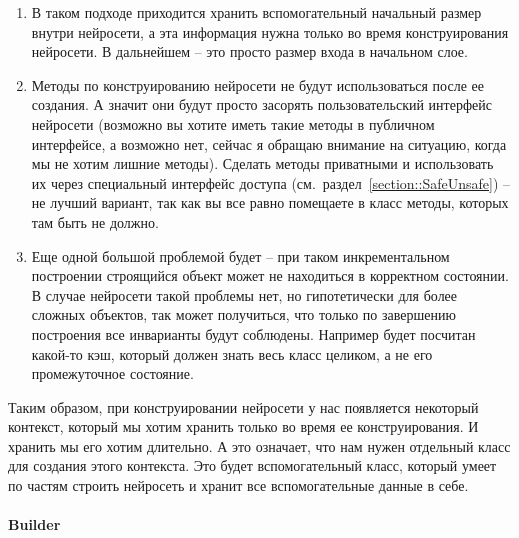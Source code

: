\begin{enumerate}
\item В таком подходе приходится хранить вспомогательный начальный размер внутри нейросети, а эта информация нужна только во время конструирования нейросети.
В дальнейшем -- это просто размер входа в начальном слое.

\item Методы по конструированию нейросети не будут использоваться после ее создания.
А значит они будут просто засорять пользовательский интерфейс нейросети (возможно вы хотите иметь такие методы в публичном интерфейсе, а возможно нет, сейчас я обращаю внимание на ситуацию, когда мы не хотим лишние методы).
Сделать методы приватными и использовать их через специальный интерфейс доступа (см.~раздел~\ref{section::SafeUnsafe}) -- не лучший вариант, так как вы все равно помещаете в класс методы, которых там быть не должно.

\item Еще одной большой проблемой будет -- при таком инкрементальном построении строящийся объект может не находиться в корректном состоянии.
В случае нейросети такой проблемы нет, но гипотетически для более сложных объектов, так может получиться, что только по завершению построения все инварианты будут соблюдены.
Например будет посчитан какой-то кэш, который должен знать весь класс целиком, а не его промежуточное состояние.
\end{enumerate}
Таким образом, при конструировании нейросети у нас появляется некоторый контекст, который мы хотим хранить только во время ее конструирования.
И хранить мы его хотим длительно.
А это означает, что нам нужен отдельный класс для создания этого контекста.
Это будет вспомогательный класс, который умеет по частям строить нейросеть и хранит все вспомогательные данные в себе.

\paragraph{Builder}

